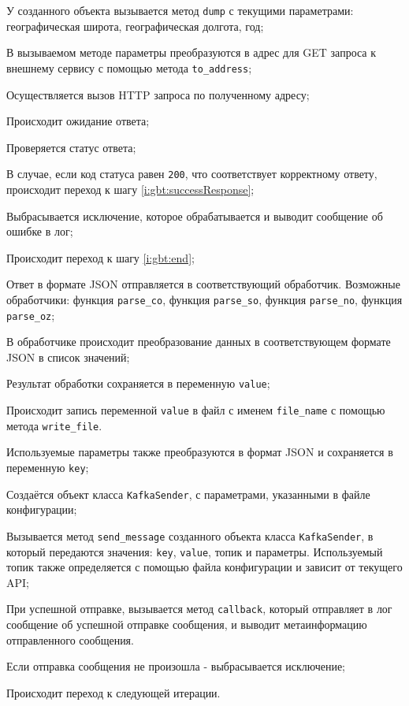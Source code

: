 \begin{enumerate_step}
    \item У созданного объекта вызывается метод \texttt{dump} с текущими параметрами: географическая широта, географическая долгота, год;
    \item В вызываемом методе параметры преобразуются в адрес для GET запроса к внешнему сервису с помощью метода \texttt{to\_address};
    \item Осуществляется вызов HTTP запроса по полученному адресу;
    \item Происходит ожидание ответа;
    \item Проверяется статус ответа;
    \item В случае, если код статуса равен \texttt{200}, что соответствует корректному ответу, происходит переход к шагу \ref{i:gbt:successResponse};
    \item Выбрасывается исключение, которое обрабатывается и выводит сообщение об ошибке в лог;
    \item Происходит переход к шагу \ref{i:gbt:end};
    \item \label{i:gbt:successResponse} Ответ в формате JSON отправляется в соответствующий обработчик. 
    Возможные обработчики: функция \texttt{parse\_co}, функция \texttt{parse\_so}, функция \texttt{parse\_no}, функция \texttt{parse\_oz};
    \item В обработчике происходит преобразование данных в соответствующем формате JSON в список значений;
    \item Результат обработки сохраняется в переменную \texttt{value};
    \item Происходит запись переменной \texttt{value} в файл с именем \texttt{file\_name} с помощью метода \texttt{write\_file}.
    \item \label{i:gbt:sendMessage} Используемые параметры также преобразуются в формат JSON и сохраняется в переменную \texttt{key};
    \item Создаётся объект класса \texttt{KafkaSender}, с параметрами, указанными в файле конфигурации;
    \item Вызывается метод \texttt{send\_message} созданного объекта класса \texttt{KafkaSender}, в который передаются значения: \texttt{key}, \texttt{value}, топик и параметры. 
    Используемый топик также определяется с помощью файла конфигурации и зависит от текущего API;
    \item При успешной отправке, вызывается метод \texttt{callback}, который отправляет в лог сообщение об успешной отправке сообщения, и выводит метаинформацию отправленного сообщения.
    \item Если отправка сообщения не произошла - выбрасывается исключение;
    \item \label{i:gbt:end} Происходит переход к следующей итерации.
\end{enumerate_step}

